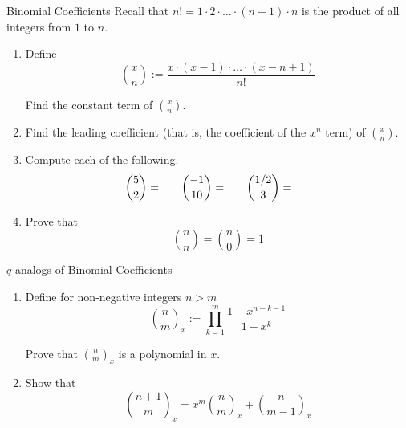 \documentclass[12pt,letterpaper]{article}
\begin{document}
\begin{problem}{Binomial Coefficients}
  Recall that \(n! = 1\cdot2 \cdot \dots \cdot (n-1) \cdot n\) is the product
  of all integers from \(1\) to \(n\).

  \begin{enumerate}
    \item Define \[
      \binom{x}{n} := \frac{x\cdot(x-1)\cdot\dots\cdot(x-n+1)}{n!}
    \]

    Find the constant term of \(\binom{x}{n}\).
    \item Find the leading coefficient (that is, the coefficient of the \(x^n\)
    term) of \(\binom{x}{n}\).
    \item Compute each of the following. \[
      \binom{5}{2} = \hspace{4ex}
      \binom{-1}{10} = \hspace{4ex}
      \binom{1/2}{3} = \hspace{4ex}
    \]
    \item Prove that \[
      \binom{n}{n} = \binom{n}{0} = 1
    \]
  \end{enumerate}
\end{problem}

\begin{problem}{\(q\)-analogs of Binomial Coefficients}
  \begin{enumerate}
    \item Define for non-negative integers \(n > m\) \[
      \binom{n}{m}_x := \prod_{k=1}^{m} \frac{1-x^{n-k-1}}{1-x^{k}}
    \]

    Prove that \(\binom{n}{m}_x\) is a polynomial in \(x\).
    \item Show that \[
      \binom{n+1}{m}_x = x^m \binom{n}{m}_x + \binom{n}{m-1}_x
    \]
  \end{enumerate}
\end{problem}
\end{document}
